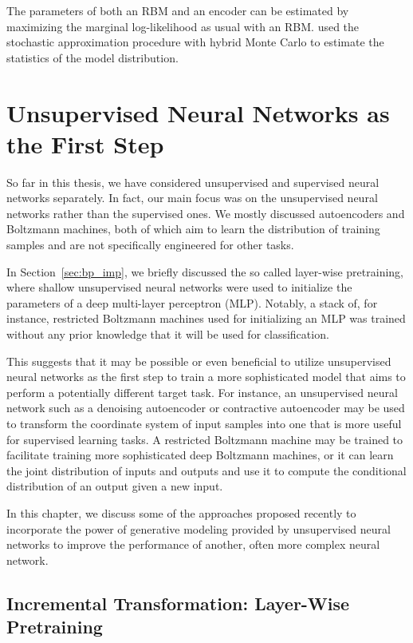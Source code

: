 \documentclass[dissertation,nocontribution,draft*]{aaltoseries}
\begin{document}
The parameters of both an RBM and an encoder can be
estimated by maximizing the marginal log-likelihood as usual
with an RBM. \citet{Ngiam2011} used the stochastic
approximation procedure with hybrid Monte Carlo
\citep{Neal1993} to estimate the statistics of the model
distribution.


\chapter{Unsupervised Neural Networks as the First Step}
\label{chap:pretraining}

So far in this thesis, we have considered unsupervised
and supervised neural networks separately.  In fact, our
main focus was on the unsupervised neural networks rather
than the supervised ones. We mostly discussed
autoencoders and Boltzmann machines, both of which aim to
learn the distribution of training samples and are not
specifically engineered for other tasks.

In Section~\ref{sec:bp_imp}, we briefly discussed the so
called layer-wise pretraining, where shallow
unsupervised neural networks were used to initialize the
parameters of a deep multi-layer perceptron (MLP). Notably,
a stack of, for instance, restricted Boltzmann machines used
for initializing an MLP was trained without any prior
knowledge that it will be used for classification.

This suggests that it may be possible or even beneficial
to utilize unsupervised neural networks as the first step to
train a more sophisticated model that aims to perform a
potentially different target task. For instance, an
unsupervised neural network such as a denoising autoencoder
or contractive autoencoder may be used to transform the
coordinate system of input samples into one that is more
useful for supervised learning tasks. A restricted Boltzmann machine
may be trained to facilitate training more sophisticated
deep Boltzmann machines, or it can learn the joint
distribution of inputs and outputs and use it to compute the
conditional distribution of an output given a new input.

In this chapter, we discuss some of the approaches proposed
recently to incorporate the power of generative modeling
provided by unsupervised neural networks to improve the
performance of another, often more complex neural network.  


\section{Incremental Transformation: Layer-Wise Pretraining}
\label{sec:layer_wise_pretraining}
\end{document}
